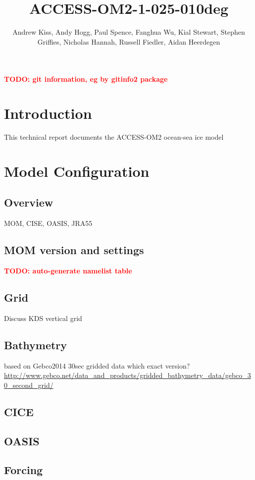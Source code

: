 \documentclass[11pt]{article}
\title{ACCESS-OM2-1-025-010deg}
\author{Andrew Kiss, Andy Hogg, Paul Spence, Fanghua Wu, Kial Stewart, Stephen Griffies, Nicholas Hannah, Russell Fiedler, Aidan Heerdegen}
\newcommand{\TODO}[1]{\textcolor{red}{\textbf{TODO: #1}}}
\begin{document}
\maketitle
\TODO{git information, eg by gitinfo2 package}

\section{Introduction}
This technical report documents the ACCESS-OM2 ocean-sea ice model

\section{Model Configuration}

\subsection{Overview}
MOM, CISE, OASIS, JRA55

\subsection{MOM version and settings}
\TODO{auto-generate namelist table}

\subsection{Grid}

Discuss KDS vertical grid

\subsection{Bathymetry}
based on Gebco2014 30sec gridded data %
which exact version? \url{http://www.gebco.net/data_and_products/gridded_bathymetry_data/gebco_30_second_grid/}

\subsection{CICE}

\subsection{OASIS}

\subsection{Forcing}
\end{document}
